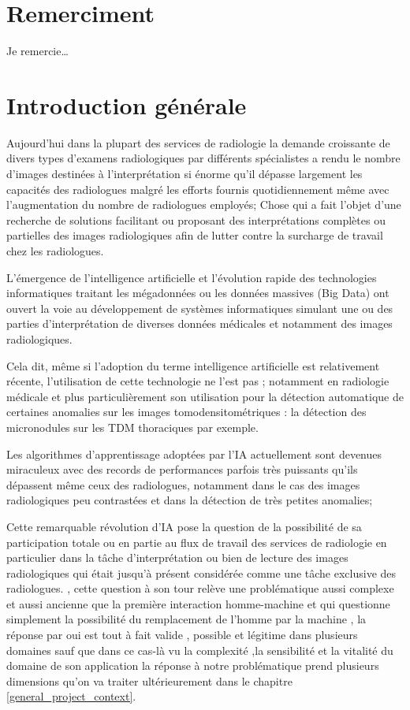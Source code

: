 \documentclass[12pt]{report}
\begin{document}
    \chapter*{Remerciment}
    Je remercie\dots
    \clearpage
    \tableofcontents
    \clearpage
    \listoffigures
    \clearpage
    \listoftables
    \clearpage
    
   \listofmyequations


   \chapter*{Introduction générale}
   Aujourd'hui dans la plupart des services de radiologie la demande croissante de divers types d'examens radiologiques par différents spécialistes a rendu le nombre d'images destinées à l'interprétation si énorme qu'il dépasse largement les capacités des radiologues malgré les efforts fournis quotidiennement   même avec l'augmentation du nombre de radiologues employés; Chose qui a fait l’objet d’une recherche de solutions facilitant ou proposant des interprétations complètes ou partielles des images radiologiques afin de lutter contre la surcharge de travail chez les radiologues.
 
    L'émergence de l’intelligence artificielle et l’évolution rapide des technologies informatiques traitant les mégadonnées ou les données massives (Big Data) ont ouvert la voie au développement de systèmes informatiques simulant une ou des parties d’interprétation de diverses données médicales et notamment des images radiologiques.
    
    Cela dit, même si l'adoption du terme intelligence artificielle est relativement récente, l'utilisation de cette technologie ne l'est pas ; notamment en radiologie médicale et plus particulièrement son utilisation pour la détection automatique de certaines anomalies sur les images tomodensitométriques : la détection des micronodules sur les TDM thoraciques par exemple.

    Les algorithmes d’apprentissage adoptées par l’IA actuellement sont devenues miraculeux avec des records de performances parfois très puissants qu’ils dépassent même ceux des radiologues, notamment dans le cas des images radiologiques peu contrastées et dans la détection de très petites anomalies; 

    Cette remarquable révolution d’IA pose la question de la possibilité de sa participation totale ou en partie au flux de travail des services de radiologie en particulier dans la tâche d'interprétation ou bien de lecture des images radiologiques qui était jusqu'à présent considérée comme une tâche exclusive des radiologues. , cette question à son tour relève une problématique aussi complexe et aussi ancienne que la première interaction homme-machine et qui questionne simplement la possibilité du remplacement de l’homme par la machine , la réponse par oui  est tout à fait valide , possible et légitime dans plusieurs domaines sauf que dans ce cas-là vu la complexité ,la sensibilité et la vitalité du domaine de son application la réponse à notre problématique prend plusieurs dimensions qu’on va traiter ultérieurement dans le chapitre \ref{general_project_context}.
\end{document}
